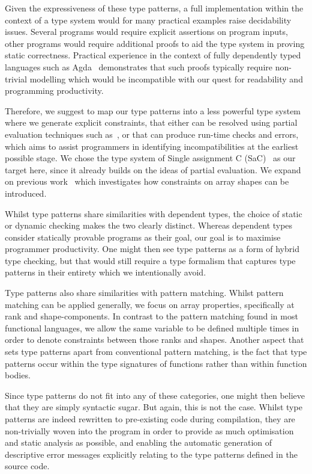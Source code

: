Given the expressiveness of these type patterns, a full implementation within the context of a type system would for many practical examples raise decidability issues.
Several programs would require explicit assertions on program inputs, other programs would require additional proofs to aid the type system in proving static correctness.
Practical experience in the context of fully dependently typed languages such as Agda~\cite{agda} demonstrates that such proofs typically require non-trivial modelling which would be incompatible with our quest for readability and programming productivity.

Therefore, we suggest to map our type patterns into a less powerful type system where we generate explicit constraints, that either can be resolved using partial evaluation techniques such as~\cite{sac-symbiotic, sac-contracts}, or that can produce run-time checks and errors, which aims to assist programmers in identifying incompatibilities at the earliest possible stage.
We chose the type system of Single assignment C (SaC)~\cite{sac, sac-productivity} as our target here, since it already builds on the ideas of partial evaluation.
We expand on previous work~\cite{sac-user-constraints, sac-hybrid-types} which investigates how constraints on array shapes can be introduced.

Whilst type patterns share similarities with dependent types, the choice of static or dynamic checking makes the two clearly distinct.
Whereas dependent types consider statically provable programs as their goal, our goal is to maximise programmer productivity.
One might then see type patterns as a form of hybrid type checking, but that would still require a type formalism that captures type patterns in their entirety which we intentionally avoid.

Type patterns also share similarities with pattern matching.
Whilst pattern matching can be applied generally, we focus on array properties, specifically at rank and shape-components.
In contrast to the pattern matching found in most functional languages, we allow the same variable to be defined multiple times in order to denote constraints between those ranks and shapes.
Another aspect that sets type patterns apart from conventional pattern matching, is
the fact that type patterns occur within the type signatures of functions rather than within function bodies.

Since type patterns do not fit into any of these categories, one might then believe that they are simply syntactic sugar.
But again, this is not the case.
Whilst type patterns are indeed rewritten to pre-existing code during compilation,
they are non-trivially woven into the program in order to provide as much optimisation and static analysis as possible, and enabling the automatic generation of descriptive error messages explicitly relating to the type patterns defined in the source code.

